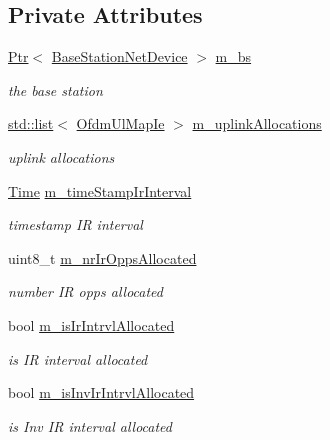 \subsection*{Private Attributes}
\begin{DoxyCompactItemize}
\item 
\hyperlink{classns3_1_1Ptr}{Ptr}$<$ \hyperlink{classns3_1_1BaseStationNetDevice}{Base\+Station\+Net\+Device} $>$ \hyperlink{classns3_1_1UplinkScheduler_aa754e1206c67ab05e8b891c4a0ffe1fa}{m\+\_\+bs}
\begin{DoxyCompactList}\small\item\em the base station \end{DoxyCompactList}\item 
\hyperlink{openflow-interface_8h_afd9bcfa176617760671b67580f536fa7}{std\+::list}$<$ \hyperlink{classns3_1_1OfdmUlMapIe}{Ofdm\+Ul\+Map\+Ie} $>$ \hyperlink{classns3_1_1UplinkScheduler_a46f2984afe126cbcf862e49b53700fdf}{m\+\_\+uplink\+Allocations}
\begin{DoxyCompactList}\small\item\em uplink allocations \end{DoxyCompactList}\item 
\hyperlink{classns3_1_1Time}{Time} \hyperlink{classns3_1_1UplinkScheduler_a5660e17dc4bb21effdd480fa97644311}{m\+\_\+time\+Stamp\+Ir\+Interval}
\begin{DoxyCompactList}\small\item\em timestamp IR interval \end{DoxyCompactList}\item 
uint8\+\_\+t \hyperlink{classns3_1_1UplinkScheduler_a9d30f3508fcdfbc881b4b8bb5979b7fc}{m\+\_\+nr\+Ir\+Opps\+Allocated}
\begin{DoxyCompactList}\small\item\em number IR opps allocated \end{DoxyCompactList}\item 
bool \hyperlink{classns3_1_1UplinkScheduler_a8ed6c292568657340ff861fa0cc50a11}{m\+\_\+is\+Ir\+Intrvl\+Allocated}
\begin{DoxyCompactList}\small\item\em is IR interval allocated \end{DoxyCompactList}\item 
bool \hyperlink{classns3_1_1UplinkScheduler_afe06da2181a94f478276407f38a8ebb0}{m\+\_\+is\+Inv\+Ir\+Intrvl\+Allocated}
\begin{DoxyCompactList}\small\item\em is Inv IR interval allocated \end{DoxyCompactList}\item 

\end{DoxyCompactItemize}
